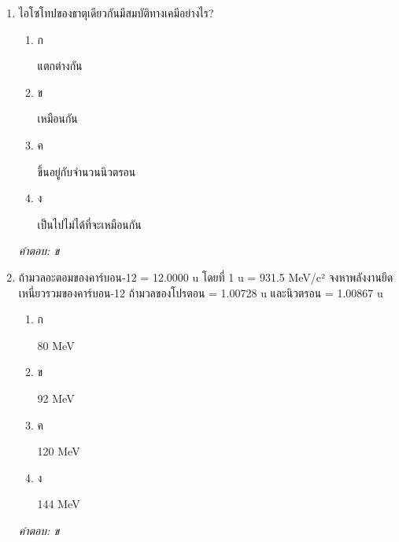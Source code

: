 \documentclass[12pt]{article}
\begin{document}
\begin{enumerate}[label=\arabic*., itemsep=0.5\baselineskip, topsep=0.5\baselineskip, leftmargin=*]
\item ไอโซโทปของธาตุเดียวกันมีสมบัติทางเคมีอย่างไร?
\begin{enumerate}[label=\alph*)., itemsep=0.3\baselineskip, topsep=0.3\baselineskip]
\item ก\ 
\begin{minipage}[t]{0.9\linewidth}
\raggedright แตกต่างกัน
\end{minipage}
\item ข\ 
\begin{minipage}[t]{0.9\linewidth}
\raggedright เหมือนกัน
\end{minipage}
\item ค\ 
\begin{minipage}[t]{0.9\linewidth}
\raggedright ขึ้นอยู่กับจำนวนนิวตรอน
\end{minipage}
\item ง\ 
\begin{minipage}[t]{0.9\linewidth}
\raggedright เป็นไปไม่ได้ที่จะเหมือนกัน
\end{minipage}
\end{enumerate}
\vspace{-0.3\baselineskip}
\begin{small}
\textit{คำตอบ: ข}
\end{small}

\item ถ้ามวลอะตอมของคาร์บอน-12 = 12.0000 u โดยที่ 1 u = 931.5 MeV/c² จงหาพลังงานยึดเหนี่ยวรวมของคาร์บอน-12 ถ้ามวลของโปรตอน = 1.00728 u และนิวตรอน = 1.00867 u
\begin{enumerate}[label=\alph*)., itemsep=0.3\baselineskip, topsep=0.3\baselineskip]
\item ก\ 
\begin{minipage}[t]{0.9\linewidth}
\raggedright 80 MeV
\end{minipage}
\item ข\ 
\begin{minipage}[t]{0.9\linewidth}
\raggedright 92 MeV
\end{minipage}
\item ค\ 
\begin{minipage}[t]{0.9\linewidth}
\raggedright 120 MeV
\end{minipage}
\item ง\ 
\begin{minipage}[t]{0.9\linewidth}
\raggedright 144 MeV
\end{minipage}
\end{enumerate}
\vspace{-0.3\baselineskip}
\begin{small}
\textit{คำตอบ: ข}
\end{small}


\end{enumerate}
\end{document}
